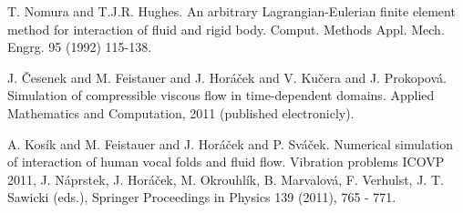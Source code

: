 
\begin{thebibliography}{10}

{\sc T. Nomura and T.J.R. Hughes}. {An arbitrary Lagrangian-Eulerian finite element method for interaction of fluid and rigid body}. Comput. Methods Appl. Mech. Engrg. 95 (1992) 115-138.



{\sc J. \v{C}esenek and M. Feistauer and J. Hor\'{a}\v{c}ek and V. Ku\v{c}era and J. Prokopov\'{a}}. {Simulation of compressible viscous flow in time-dependent domains}. Applied Mathematics and Computation, 2011 (published electronicly).



{\sc A. Kos\'{i}k and M. Feistauer and J. Hor\'{a}\v{c}ek and P. Sv\'{a}\v{c}ek}. {Numerical simulation of interaction of human vocal folds and fluid flow}. Vibration problems ICOVP 2011, J. N\'{a}prstek, J. Hor\'{a}\v{c}ek, M. Okrouhl\'{i}k, B. Marvalov\'{a}, F. Verhulst, J. T. Sawicki (eds.), Springer Proceedings in Physics 139 (2011), 765 - 771.

\end{thebibliography}
